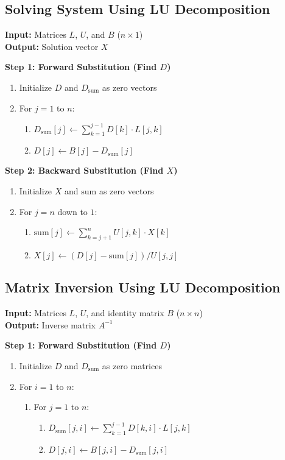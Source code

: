 \documentclass[a4paper,12pt]{article}
\begin{document}
\subsection{Solving System Using LU Decomposition}
\textbf{Input:} Matrices $L$, $U$, and $B$ ($n \times 1$) \\
\textbf{Output:} Solution vector $X$

\textbf{Step 1: Forward Substitution (Find $D$)}
\begin{enumerate}
	\item Initialize $D$ and $D_{\text{sum}}$ as zero vectors
	\item For $j = 1$ to $n$:
	\begin{enumerate}
		\item $D_{\text{sum}}[j] \leftarrow \sum_{k=1}^{j-1} D[k] \cdot L[j,k]$
		\item $D[j] \leftarrow B[j] - D_{\text{sum}}[j]$
	\end{enumerate}
\end{enumerate}

\textbf{Step 2: Backward Substitution (Find $X$)}
\begin{enumerate}
	\item Initialize $X$ and $\text{sum}$ as zero vectors
	\item For $j = n$ down to $1$:
	\begin{enumerate}
		\item $\text{sum}[j] \leftarrow \sum_{k=j+1}^{n} U[j,k] \cdot X[k]$
		\item $X[j] \leftarrow (D[j] - \text{sum}[j]) / U[j,j]$
	\end{enumerate}
\end{enumerate}

\subsection{Matrix Inversion Using LU Decomposition}
\textbf{Input:} Matrices $L$, $U$, and identity matrix $B$ ($n \times n$) \\
\textbf{Output:} Inverse matrix $A^{-1}$

\textbf{Step 1: Forward Substitution (Find $D$)}
\begin{enumerate}
	\item Initialize $D$ and $D_{\text{sum}}$ as zero matrices
	\item For $i = 1$ to $n$:
	\begin{enumerate}
		\item For $j = 1$ to $n$:
		\begin{enumerate}
			\item $D_{\text{sum}}[j,i] \leftarrow \sum_{k=1}^{j-1} D[k,i] \cdot L[j,k]$
			\item $D[j,i] \leftarrow B[j,i] - D_{\text{sum}}[j,i]$
		\end{enumerate}
	\end{enumerate}
\end{enumerate}
\end{document}
